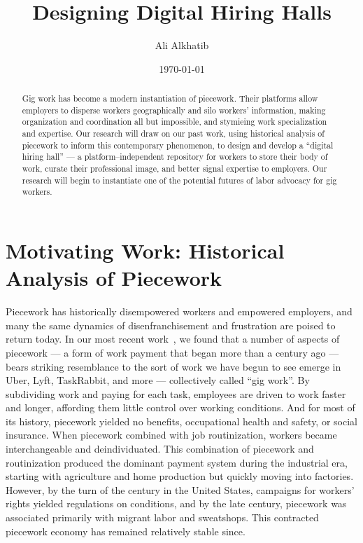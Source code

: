 \documentclass{article}
\title{Designing Digital Hiring Halls}
\author{Ali Alkhatib}
\date{\today}
\newcommand{\topic}[1]{{\color{Blue}#1}}
\renewcommand{\topic}[1]{{#1}}
\begin{document}
  \maketitle
  \begin{abstract}
    Gig work has become a modern instantiation of piecework.
    Their platforms allow employers to
    disperse workers geographically and silo workers' information,
    making organization and coordination all but impossible,
    and stymieing work specialization and expertise.
    Our research will draw on our past work,
    using historical analysis of piecework to inform this contemporary phenomenon,
    to design and develop a ``digital hiring hall''
    --- a platform--independent repository for workers to store their body of work, curate their professional image,
    and better signal expertise to employers.
    Our research will
    begin to instantiate one of the potential futures of labor advocacy for gig workers.
  \end{abstract}











\section*{Motivating Work: Historical Analysis of Piecework}
\topic{Piecework has historically disempowered workers and empowered employers, and
many the same dynamics of disenfranchisement and frustration are poised to return today.}
In our most recent work~\cite{pieceworkCrowdworkGigwork}, we found that a number of aspects of piecework
--- a form of work payment that began more than a century ago ---
bears striking resemblance to the sort of work we have begun to see emerge in Uber, Lyft, TaskRabbit, and more
--- collectively called ``gig work''.
By subdividing work and paying for each task, employees are driven to work faster and longer,
affording them little control over working conditions.
And for most of its history, piecework yielded no benefits, occupational health and safety, or social insurance.
When piecework combined with job routinization, workers became interchangeable and deindividuated.
This combination of piecework and routinization produced the dominant payment system during the industrial era,
starting with agriculture and home production but quickly moving into factories.
However, by the turn of the  century in the United States,
campaigns for workers' rights yielded regulations on conditions, and by the late  century,
piecework was associated primarily with migrant labor and sweatshops.
This contracted piecework economy has remained relatively stable since.
\end{document}
